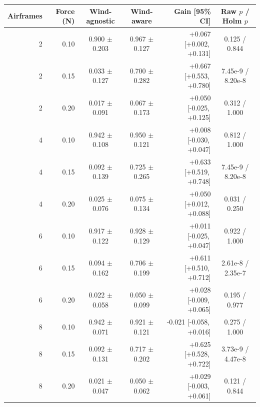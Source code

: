 \begingroup
\setlength{\tabcolsep}{2pt}
\begin{tabular}{@{}rrccrc@{}}
\toprule
Airframes & Force (N) & Wind-agnostic & Wind-aware & Gain [95\% CI] & Raw $p$ / Holm $p$ \\
\midrule
2 & 0.10 & 0.900 $\pm$ 0.203 & 0.967 $\pm$ 0.127 & +0.067 [+0.002,\, +0.131] & 0.125 / 0.844 \\
2 & 0.15 & 0.033 $\pm$ 0.127 & 0.700 $\pm$ 0.282 & +0.667 [+0.553,\, +0.780] & 7.45e-9 / 8.20e-8 \\
2 & 0.20 & 0.017 $\pm$ 0.091 & 0.067 $\pm$ 0.173 & +0.050 [-0.025,\, +0.125] & 0.312 / 1.000 \\
4 & 0.10 & 0.942 $\pm$ 0.108 & 0.950 $\pm$ 0.121 & +0.008 [-0.030,\, +0.047] & 0.812 / 1.000 \\
4 & 0.15 & 0.092 $\pm$ 0.139 & 0.725 $\pm$ 0.265 & +0.633 [+0.519,\, +0.748] & 7.45e-9 / 8.20e-8 \\
4 & 0.20 & 0.025 $\pm$ 0.076 & 0.075 $\pm$ 0.134 & +0.050 [+0.012,\, +0.088] & 0.031 / 0.250 \\
6 & 0.10 & 0.917 $\pm$ 0.122 & 0.928 $\pm$ 0.129 & +0.011 [-0.025,\, +0.047] & 0.922 / 1.000 \\
6 & 0.15 & 0.094 $\pm$ 0.162 & 0.706 $\pm$ 0.199 & +0.611 [+0.510,\, +0.712] & 2.61e-8 / 2.35e-7 \\
6 & 0.20 & 0.022 $\pm$ 0.058 & 0.050 $\pm$ 0.099 & +0.028 [-0.009,\, +0.065] & 0.195 / 0.977 \\
8 & 0.10 & 0.942 $\pm$ 0.071 & 0.921 $\pm$ 0.121 & -0.021 [-0.058,\, +0.016] & 0.275 / 1.000 \\
8 & 0.15 & 0.092 $\pm$ 0.131 & 0.717 $\pm$ 0.202 & +0.625 [+0.528,\, +0.722] & 3.73e-9 / 4.47e-8 \\
8 & 0.20 & 0.021 $\pm$ 0.047 & 0.050 $\pm$ 0.062 & +0.029 [-0.003,\, +0.061] & 0.121 / 0.844 \\
\bottomrule
\end{tabular}
\endgroup
